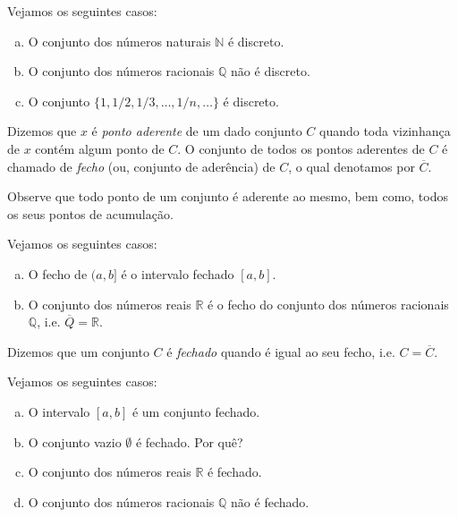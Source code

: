 \begin{ex}
  Vejamos os seguintes casos:
  \begin{enumerate}[a)]
  \item O conjunto dos números naturais $\mathbb{N}$ é discreto.
  \item O conjunto dos números racionais $\mathbb{Q}$ não é discreto.
  \item O conjunto $\{1, 1/2, 1/3, \dotsc, 1/n, \ldots\}$ é discreto.
  \end{enumerate}
\end{ex}

\begin{defn}
  Dizemos que $x$ é \emph{ponto aderente} de um dado conjunto $C$ quando toda vizinhança de $x$ contém algum ponto de $C$. O conjunto de todos os pontos aderentes de $C$ é chamado de \emph{fecho} (ou, conjunto de aderência) de $C$, o qual denotamos por $\overline{C}$.
\end{defn}

\begin{obs}
  Observe que todo ponto de um conjunto é aderente ao mesmo, bem como, todos os seus pontos de acumulação.
\end{obs}

\begin{ex}
  Vejamos os seguintes casos:
  \begin{enumerate}[a)]
  \item O fecho de $(a, b]$ é o intervalo fechado $[a, b]$.
  \item O conjunto dos números reais $\mathbb{R}$ é o fecho do conjunto dos números racionais $\mathbb{Q}$, i.e. $\overline{Q} = \mathbb{R}$.
  \end{enumerate}
\end{ex}

\begin{defn}
  Dizemos que um conjunto $C$ é \emph{fechado} quando é igual ao seu fecho, i.e. $C = \overline{C}$.
\end{defn}

\begin{ex}
  Vejamos os seguintes casos:
  \begin{enumerate}[a)]
  \item O intervalo $[a, b]$ é um conjunto fechado.
  \item O conjunto vazio $\emptyset$ é fechado. Por quê?
  \item O conjunto dos números reais $\mathbb{R}$ é fechado.
  \item O conjunto dos números racionais $\mathbb{Q}$ não é fechado.
  \end{enumerate}
\end{ex}

